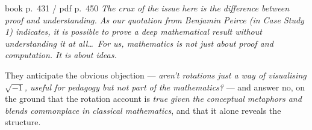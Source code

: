 \begin{warmbox}[title={The key word is \emph{motivate} --- and the crux is proof vs.\ understanding}]
\begin{bookquote}{book p.~431 / pdf p.~450}
\textit{The crux of the issue here is the difference between proof and understanding. As our
quotation from Benjamin Peirce (in Case Study 1) indicates, it is possible to prove a deep
mathematical result without understanding it at all\ldots\ For us, mathematics is not just about
proof and computation. It is about ideas.}
\end{bookquote}
\noindent They anticipate the obvious objection --- \emph{aren't rotations just a way of visualising
$\sqrt{-1}$, useful for pedagogy but not part of the mathematics?} --- and answer no, on the ground
that the rotation account is \emph{true given the conceptual metaphors and blends commonplace in
classical mathematics}, and that it alone reveals the structure.
\end{warmbox}
